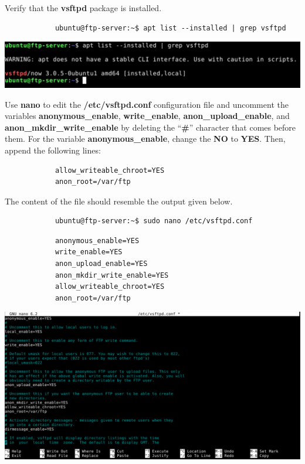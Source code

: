 \documentclass[letterpaper, 12pt]{article}
\begin{document}
\begin{enumerate}
    \begin{labstep}
        Verify that the \textbf{vsftpd} package is installed.
        \begin{lstlisting}
            ubuntu@ftp-server:~$ apt list --installed | grep vsftpd
        \end{lstlisting}

        \begin{center}
            \includegraphics[width=\linewidth]{images/part2/step9.png}
        \end{center}
    \end{labstep}

    \begin{labstep}
        Use \textbf{nano} to edit the \textbf{/etc/vsftpd.conf} configuration file and uncomment the variables \textbf{anonymous\_enable}, \textbf{write\_enable}, \textbf{anon\_upload\_enable}, and \textbf{anon\_mkdir\_write\_enable} by deleting the ``\textbf{\#}'' character that comes before them.
        For the variable \textbf{anonymous\_enable}, change the \textbf{NO} to \textbf{YES}.
        Then, append the following lines:
        \begin{lstlisting}
            allow_writeable_chroot=YES
            anon_root=/var/ftp
        \end{lstlisting}
        The content of the file should resemble the output given below.
        \begin{lstlisting}
            ubuntu@ftp-server:~$ sudo nano /etc/vsftpd.conf
        \end{lstlisting}
        \begin{lstlisting}
            anonymous_enable=YES
            write_enable=YES
            anon_upload_enable=YES
            anon_mkdir_write_enable=YES
            allow_writeable_chroot=YES
            anon_root=/var/ftp
        \end{lstlisting}

        \begin{center}
            \includegraphics[width=\linewidth]{images/part2/step10.png}
        \end{center}
    \end{labstep}


\end{enumerate}
\end{document}
